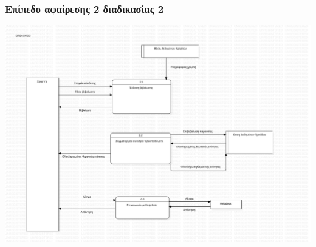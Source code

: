\documentclass[a4paper, titlepage, twoside]{article}
\begin{document}
\subsubsection{Επίπεδο αφαίρεσης 2 διαδικασίας 2}
\label{sec:orgfcc3284}
\begin{center}
\includegraphics[width=.9\linewidth]{drd2.pdf}
\end{center}
\end{document}
